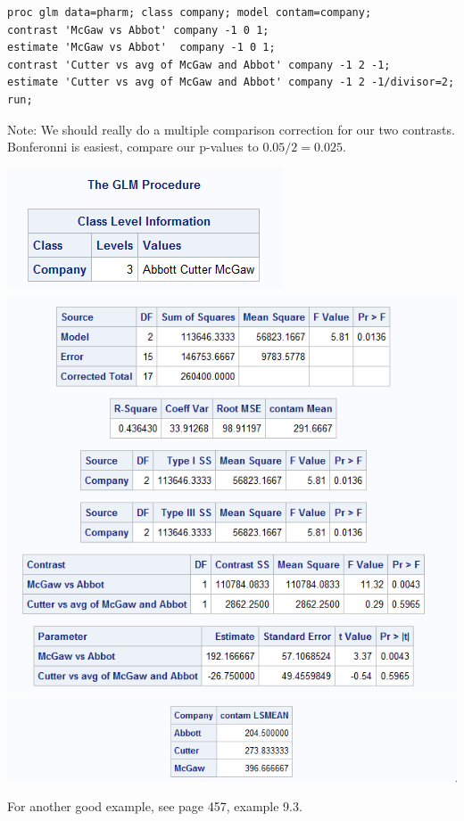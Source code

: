 \newpage

\begin{small}
\begin{verbatim}
proc glm data=pharm; class company; model contam=company;
contrast 'McGaw vs Abbot' company -1 0 1;
estimate 'McGaw vs Abbot'  company -1 0 1;
contrast 'Cutter vs avg of McGaw and Abbot' company -1 2 -1;
estimate 'Cutter vs avg of McGaw and Abbot' company -1 2 -1/divisor=2; run;
\end{verbatim}
\end{small}
 Note: We should really do a multiple comparison correction for our two contrasts.  Bonferonni is easiest, compare our p-values to $0.05/2=0.025$.
\begin{flushleft}
\includegraphics[scale=0.7]{PharmGLM1}\\
\includegraphics[scale=0.7]{PharmGLM2}\\
\includegraphics[scale=0.7]{PharmGLM3}
\end{flushleft}

For another good example, see page 457, example 9.3.



